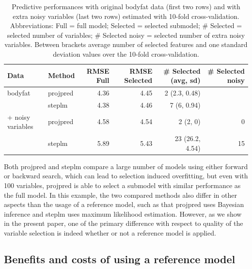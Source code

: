 \documentclass[a4]{article}
\theoremstyle{definition}
\begin{document}
\begin{table}[tp]
\footnotesize
\centering
\begin{tabular}{ll|rrrr}
Data  & Method & RMSE Full & RMSE Selected & \# Selected (avg, sd) & \# Selected noisy \\ 
  \hline
bodyfat & projpred & 4.36 & 4.45 & 2 (2.3, 0.48) &   \\
& steplm & 4.38 & 4.46 & 7 (6, 0.94) &  \\
\hline
+ noisy variables & projpred & 4.58 & 4.54 & 2 (2, 0)& 0  \\
& steplm & 5.89 & 5.43 & 23 (26.2, 4.54) & 15 \\
\end{tabular}
\caption{Predictive performances with original bodyfat data (first two
  rows) and with extra noisy variables (last two rows) estimated with
  10-fold cross-validation. Abbreviations: Full = full model; Selected =
  selected submodel; \# Selected = selected number of variables;
  \# Selected noisy = selected number of extra noisy variables. 
  Between brackets average number of selected features and one standard deviation
  values over the 10-fold cross-validation.}
\label{tab:model_performances}
\end{table}

Both projpred and steplm compare a large number of models using either
forward or backward search, which can lead to selection induced
overfitting, but even with 100 variables, projpred is able to select a
submodel with similar performance as the full model. In this example, the two
 compared methods also differ in other aspects than the usage of a reference 
 model, such as that projpred
uses Bayesian inference and steplm uses maximum likelihood estimation. 
However, as we show in the present paper, one of the primary difference 
with respect to quality of the variable selection is indeed whether or 
not a reference model is applied.

\subsection{Benefits and costs of using a reference model}
\end{document}

